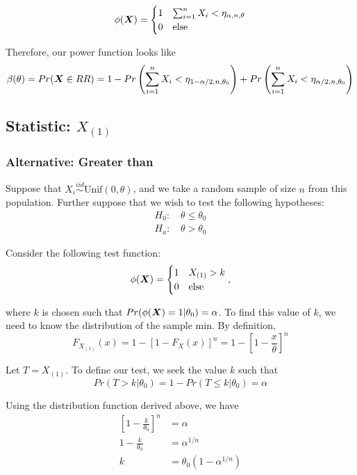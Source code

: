 \documentclass[]{article}
\newcommand{\bfX}{\mbox{\boldmath $X$}}
\begin{document}
\[
\phi(\bfX) = \begin{cases}
1 & \sum_{i=1}^n X_i < \eta_{\alpha, n, \theta}\\
0 & \text{else}
\end{cases}
\]

Therefore, our power function looks like
\[
\begin{split}
\beta(\theta) &= Pr(\bfX \in RR) = 1 - Pr\left(\sum_{i=1}^n X_i < \eta_{1-\alpha/2, n, \theta_0}\right) + Pr\left(\sum_{i=1}^n X_i < \eta_{\alpha/2, n, \theta_0}\right) \\
\end{split}
\]

\subsection{Statistic: $X_{(1)}$}

\subsubsection{Alternative: Greater than}

Suppose that $X_i \stackrel{iid}{\sim} \text{Unif}(0, \theta)$, and we take a random sample of size $n$ from this population. Further suppose that we wish to test the following hypotheses:
\[
\begin{split}
\text{$H_0$: }& \theta \leq \theta_0 \\
\text{$H_a$: }& \theta > \theta_0
\end{split}
\]

Consider the following test function:
\[
\phi(\bfX) = \begin{cases}
1 & X_{(1)} > k \\
0 & \text{else}
\end{cases},
\]

where $k$ is chosen such that $Pr(\phi(\bfX) = 1|\theta_0) = \alpha$. To find this value of $k$, we need to know the distribution of the sample min. By definition, 
\[
F_{X_{(1)}}(x) = 1 - \left[1 - F_X(x)\right]^n = 1 - \left[1 - \frac{x}{\theta}\right]^n
\]

Let $T = X_{(1)}$. To define our test, we seek the value $k$ such that 
\[
Pr(T > k | \theta_0) = 1 - Pr(T \leq k | \theta_0) = \alpha
\]

Using the distribution function derived above, we have
\[
\begin{split}
\left[1 - \frac{k}{\theta_0}\right]^n &= \alpha \\
1 - \frac{k}{\theta_0} &= \alpha^{1/n} \\
k &= \theta_0(1 - \alpha^{1/n})
\end{split}
\]
\end{document}
